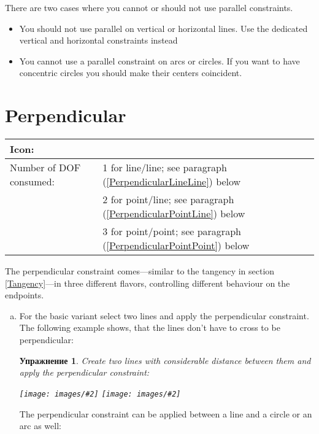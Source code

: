 \documentclass[12pt,titlepage]{article}
\newcommand{\icon}[1]{\raisebox{-1em}{\rule{0pt}{27pt}\texttt{[image: images/\#1]}}}
\newcommand{\img}[2]{\vspace{2ex}\noindent\texttt{[image: images/\#2]}}
\newcommand{\dofConsumed}{Number of DOF consumed:}
\newtheorem{Exercise}{Упражнение}
\begin{document}
\begin {itemize}
There are two cases where you cannot or should not use parallel constraints.
\begin{itemize}
\item You should not use parallel on vertical or horizontal lines. Use the dedicated
      vertical and horizontal constraints instead
\item You cannot use a parallel constraint on arcs or circles. If you want to have
      concentric circles you should make their centers coincident.
\end{itemize}

\section{Perpendicular}
\begin{tabular}{|l|l|}
\hline
Icon: & \icon{Constraint_Perpendicular}\\
\hline
\dofConsumed & 1 for line/line;
                            see paragraph (\ref{PerpendicularLineLine}) below \\
                        & 2 for point/line;
                            see paragraph (\ref{PerpendicularPointLine}) below \\
                        & 3 for point/point;
                            see paragraph (\ref{PerpendicularPointPoint}) below \\
\hline
\end{tabular}

The perpendicular constraint comes---similar to the tangency in section
\vref{Tangency}---in three different flavors, controlling different behaviour on the
endpoints.

\begin{enumerate}[(a)]
\item \label{PerpendicularLineLine} For the basic variant select two lines and apply
      the perpendicular constraint. The following example shows, that the lines don't
      have to cross to be perpendicular:

\begin{Exercise}
Create two lines with considerable distance between them and apply the perpendicular
constraint:

\img{width=0.4\textwidth}{Perpendicular1}
\hfill
\raisebox{1cm}{$\stackrel{\icon{Constraint_Perpendicular}}{\longrightarrow}$}
\hfill
\img{width=0.4\textwidth}{Perpendicular2}

\end{Exercise}

The perpendicular constraint can be applied between a line and a circle or an arc as well:


\end{enumerate}
\end{itemize}
\end{document}
